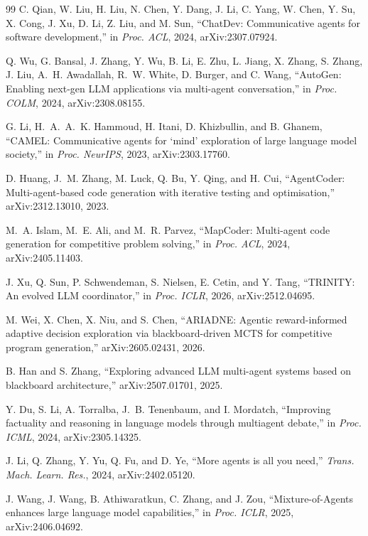 \documentclass[11pt]{article}
\begin{document}
\begin{thebibliography}{99}
 C. Qian, W. Liu, H. Liu, N. Chen, Y. Dang, J. Li, C. Yang, W. Chen,
Y. Su, X. Cong, J. Xu, D. Li, Z. Liu, and M. Sun, ``ChatDev: Communicative agents for
software development,'' in \textit{Proc. ACL}, 2024, arXiv:2307.07924.

 Q. Wu, G. Bansal, J. Zhang, Y. Wu, B. Li, E. Zhu, L. Jiang, X. Zhang,
S. Zhang, J. Liu, A.~H. Awadallah, R.~W. White, D. Burger, and C. Wang, ``AutoGen:
Enabling next-gen LLM applications via multi-agent conversation,'' in \textit{Proc. COLM},
2024, arXiv:2308.08155.

 G. Li, H.~A.~A.~K. Hammoud, H. Itani, D. Khizbullin, and B. Ghanem,
``CAMEL: Communicative agents for `mind' exploration of large language model society,'' in
\textit{Proc. NeurIPS}, 2023, arXiv:2303.17760.

 D. Huang, J.~M. Zhang, M. Luck, Q. Bu, Y. Qing, and H. Cui,
``AgentCoder: Multi-agent-based code generation with iterative testing and
optimisation,'' arXiv:2312.13010, 2023.

 M.~A. Islam, M.~E. Ali, and M.~R. Parvez, ``MapCoder: Multi-agent code
generation for competitive problem solving,'' in \textit{Proc. ACL}, 2024,
arXiv:2405.11403.

 J. Xu, Q. Sun, P. Schwendeman, S. Nielsen, E. Cetin, and Y. Tang,
``TRINITY: An evolved LLM coordinator,'' in \textit{Proc. ICLR}, 2026, arXiv:2512.04695.

 M. Wei, X. Chen, X. Niu, and S. Chen, ``ARIADNE: Agentic reward-informed
adaptive decision exploration via blackboard-driven MCTS for competitive program
generation,'' arXiv:2605.02431, 2026.

 B. Han and S. Zhang, ``Exploring advanced LLM multi-agent systems based
on blackboard architecture,'' arXiv:2507.01701, 2025.

 Y. Du, S. Li, A. Torralba, J.~B. Tenenbaum, and I. Mordatch, ``Improving
factuality and reasoning in language models through multiagent debate,'' in
\textit{Proc. ICML}, 2024, arXiv:2305.14325.

 J. Li, Q. Zhang, Y. Yu, Q. Fu, and D. Ye, ``More agents is all you need,''
\textit{Trans. Mach. Learn. Res.}, 2024, arXiv:2402.05120.

 J. Wang, J. Wang, B. Athiwaratkun, C. Zhang, and J. Zou,
``Mixture-of-Agents enhances large language model capabilities,'' in \textit{Proc. ICLR},
2025, arXiv:2406.04692.


\end{thebibliography}
\end{document}

